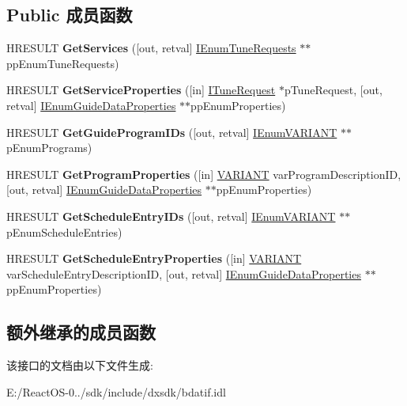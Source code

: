 \subsection*{Public 成员函数}
\begin{DoxyCompactItemize}
\item 
\mbox{\label{interface_i_guide_data_a3e2dee5c72072d20fabf9e6ab15b3e82}} 
H\+R\+E\+S\+U\+LT {\bfseries Get\+Services} (\mbox{[}out, retval\mbox{]} \hyperlink{interface_i_enum_tune_requests}{I\+Enum\+Tune\+Requests} $\ast$$\ast$pp\+Enum\+Tune\+Requests)
\item 
\mbox{\label{interface_i_guide_data_a2e775de6829dec589d109c790bd7354d}} 
H\+R\+E\+S\+U\+LT {\bfseries Get\+Service\+Properties} (\mbox{[}in\mbox{]} \hyperlink{interface_i_tune_request}{I\+Tune\+Request} $\ast$p\+Tune\+Request, \mbox{[}out, retval\mbox{]} \hyperlink{interface_i_enum_guide_data_properties}{I\+Enum\+Guide\+Data\+Properties} $\ast$$\ast$pp\+Enum\+Properties)
\item 
\mbox{\label{interface_i_guide_data_aed509c173cbb1a635fc46be0b7a8c2a0}} 
H\+R\+E\+S\+U\+LT {\bfseries Get\+Guide\+Program\+I\+Ds} (\mbox{[}out, retval\mbox{]} \hyperlink{interface_i_enum_v_a_r_i_a_n_t}{I\+Enum\+V\+A\+R\+I\+A\+NT} $\ast$$\ast$p\+Enum\+Programs)
\item 
\mbox{\label{interface_i_guide_data_a0d4a0259b564d4066530c4348607e409}} 
H\+R\+E\+S\+U\+LT {\bfseries Get\+Program\+Properties} (\mbox{[}in\mbox{]} \hyperlink{structtag_v_a_r_i_a_n_t}{V\+A\+R\+I\+A\+NT} var\+Program\+Description\+ID, \mbox{[}out, retval\mbox{]} \hyperlink{interface_i_enum_guide_data_properties}{I\+Enum\+Guide\+Data\+Properties} $\ast$$\ast$pp\+Enum\+Properties)
\item 
\mbox{\label{interface_i_guide_data_aaecb3d7be18b685d3a20225f0f5e557f}} 
H\+R\+E\+S\+U\+LT {\bfseries Get\+Schedule\+Entry\+I\+Ds} (\mbox{[}out, retval\mbox{]} \hyperlink{interface_i_enum_v_a_r_i_a_n_t}{I\+Enum\+V\+A\+R\+I\+A\+NT} $\ast$$\ast$p\+Enum\+Schedule\+Entries)
\item 
\mbox{\label{interface_i_guide_data_a7d91fb42adaad967b471ae9a52e2ea57}} 
H\+R\+E\+S\+U\+LT {\bfseries Get\+Schedule\+Entry\+Properties} (\mbox{[}in\mbox{]} \hyperlink{structtag_v_a_r_i_a_n_t}{V\+A\+R\+I\+A\+NT} var\+Schedule\+Entry\+Description\+ID, \mbox{[}out, retval\mbox{]} \hyperlink{interface_i_enum_guide_data_properties}{I\+Enum\+Guide\+Data\+Properties} $\ast$$\ast$pp\+Enum\+Properties)
\end{DoxyCompactItemize}
\subsection*{额外继承的成员函数}


该接口的文档由以下文件生成\+:\begin{DoxyCompactItemize}
\item 
E\+:/\+React\+O\+S-\/0../sdk/include/dxsdk/bdatif.\+idl\end{DoxyCompactItemize}
